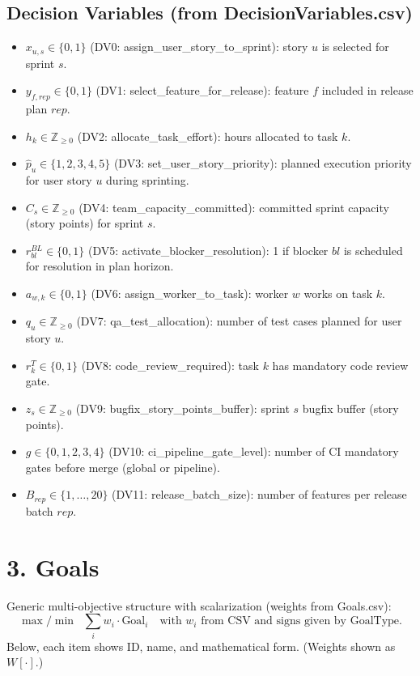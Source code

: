 \documentclass[11pt,a4paper]{article}
\begin{document}
\subsection*{Decision Variables (from DecisionVariables.csv)}
\begin{itemize}[leftmargin=1.2cm]
  \item $x_{u,s} \in \{0,1\}$ (DV0: assign\_user\_story\_to\_sprint): story $u$ is selected for sprint $s$.
  \item $y_{f,rep} \in \{0,1\}$ (DV1: select\_feature\_for\_release): feature $f$ included in release plan $rep$.
  \item $h_k \in \mathbb{Z}_{\ge 0}$ (DV2: allocate\_task\_effort): hours allocated to task $k$.
  \item $\hat{p}_u \in \{1,2,3,4,5\}$ (DV3: set\_user\_story\_priority): planned execution priority for user story $u$ during sprinting.
  \item $C_s \in \mathbb{Z}_{\ge 0}$ (DV4: team\_capacity\_committed): committed sprint capacity (story points) for sprint $s$.
  \item $r^{BL}_{bl} \in \{0,1\}$ (DV5: activate\_blocker\_resolution): 1 if blocker $bl$ is scheduled for resolution in plan horizon.
  \item $a_{w,k} \in \{0,1\}$ (DV6: assign\_worker\_to\_task): worker $w$ works on task $k$.
  \item $q_u \in \mathbb{Z}_{\ge 0}$ (DV7: qa\_test\_allocation): number of test cases planned for user story $u$.
  \item $r^T_k \in \{0,1\}$ (DV8: code\_review\_required): task $k$ has mandatory code review gate.
  \item $z_s \in \mathbb{Z}_{\ge 0}$ (DV9: bugfix\_story\_points\_buffer): sprint $s$ bugfix buffer (story points).
  \item $g \in \{0,1,2,3,4\}$ (DV10: ci\_pipeline\_gate\_level): number of CI mandatory gates before merge (global or pipeline).
  \item $B_{rep} \in \{1,\dots,20\}$ (DV11: release\_batch\_size): number of features per release batch $rep$.
\end{itemize}

\section{3. Goals}
\noindent Generic multi-objective structure with scalarization (weights from Goals.csv):
\[
\max/\min \;\; \sum_{i} w_i \cdot \text{Goal}_i \quad \text{with } w_i \text{ from CSV and signs given by GoalType.}
\]
Below, each item shows ID, name, and mathematical form. (Weights shown as $W[\cdot]$.)
\end{document}
